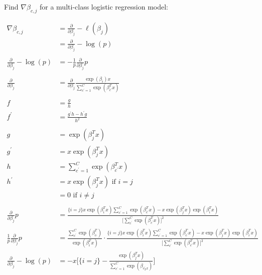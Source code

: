 \documentclass[11pt]{article}
\begin{document}
Find $\nabla \beta_{c,j}$ for a multi-class logistic regression model: 

\begin{align*}
	\nabla \beta_{c,j} &= \frac{\partial}{\partial \beta_{j}} -\ell(\beta_{j})\\
	&= \frac{\partial}{\partial \beta_{j}} -\log(p)\\
	\\
	\frac{\partial}{\partial \beta_{j}} -\log(p) &= -\frac{1}{p} \frac{\partial}{\partial \beta_{j}}p\\
	\\
	\frac{\partial}{\partial \beta_{j}} &= \frac{\partial}{\partial \beta_{j}} \frac{\exp(\beta_{i})x}{\sum_{c^{\prime}=1}^{C}\exp(\beta_{c^{\prime}}^{T}x)}\\
	\\
	f &= \frac{g}{h}\\
	f^{\prime}&=\frac{g^{\prime}h-h^{\prime}g}{h^{2}}\\
	\\
	g &= \exp(\beta_{j}^{T}x)\\
	g^{\prime} &= x\exp(\beta_{j}^{T}x)\\
	h &= \sum_{c^{\prime}=1}^{C}\exp(\beta_{c^{\prime}}^{T}x)\\
	h^{\prime} &= x\exp(\beta_{j}^{T}x) \text{ if } i = j\\
	&= 0 \text{ if } i \neq j\\
	\\
	\frac{\partial}{\partial \beta_{j}}p &= \frac{\{i=j\}x \exp(\beta_{i}^{T}x)\sum_{c^{\prime}=1}^{C} \exp(\beta_{c^{\prime}}^{T}x)-x \exp(\beta_{j}^{T}x) \exp(\beta_{i}^{T}x)}{\big[\sum_{c^{\prime}}^{C} \exp(\beta_{c^{\prime}}^{T}x)\big]^{2}}\\
	\frac{1}{p}\frac{\partial}{\partial \beta_{j}}p &= \frac{\sum_{c^{\prime}}^{C} \exp(\beta_{c_{\prime}}^{T})}{\exp(\beta_{i}^{T}x)} \cdot \frac{\{i=j\}x \exp(\beta_{i}^{T}x)\sum_{c^{\prime}=1}^{C} \exp(\beta_{c^{\prime}}^{T}x)-x \exp(\beta_{j}^{T}x) \exp(\beta_{i}^{T}x)}{\big[\sum_{c^{\prime}}^{C} \exp(\beta_{c^{\prime}}^{T}x)\big]^{2}}\\
	\frac{\partial}{\partial \beta_{j}} -\log(p) &= -x \bigg[\{i=j\}-\frac{\exp(\beta_{j}^{T}x)}{\sum_{c^{\prime}=1}^{C} \exp(\beta_{c^{\prime}_{T}x})} \bigg]\\
\end{align*}
\end{document}
